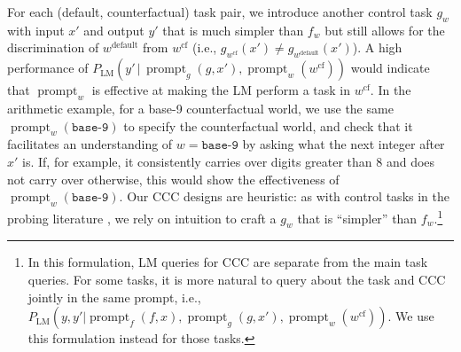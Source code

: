 For each (default, counterfactual) task pair,
we introduce another control task $g_w$ with input $x'$ and output $y'$ that is much simpler than $f_w$ but still allows for the discrimination of $w^{\text{default}}$ from $w^{\text{cf}}$ (i.e., $g_{w^{\text{cf}}}(x') \ne g_{w^{\text{default}}}(x')$).
A high performance of $P_\text{LM}(y'\, |\, \operatorname{prompt}_g(g, x'), \operatorname{prompt}_w(w^{\text{cf}}))$ would indicate that  $\operatorname{prompt}_w$ is effective at making the LM perform a task in $w^{\text{cf}}$.
In the arithmetic example, for a base-9 counterfactual world, we use the same $\operatorname{prompt}_w(\texttt{base-9})$ to specify the counterfactual world, and check that it facilitates an understanding of $w=\texttt{base-9}$ by asking what the next integer after $x'$ is. If, for example, it consistently carries over digits greater than 8 and does not carry over otherwise, this would show the effectiveness of $\operatorname{prompt}_w(\texttt{base-9})$. Our CCC designs are heuristic: as with control tasks in the probing literature \citep{hewitt2019designing},
we rely on intuition to craft a $g_w$ that is ``simpler'' than $f_w$.\footnote{In this formulation, LM queries for CCC are separate from the main task queries. For some tasks, it is more natural to query about the task and CCC jointly in the same prompt, i.e., $P_{\text{LM}}(y, y' | \operatorname{prompt}_f(f, x), \operatorname{prompt}_g(g, x'), \operatorname{prompt}_w(w^{\text{cf}}))$. We use this formulation instead for those tasks.}
